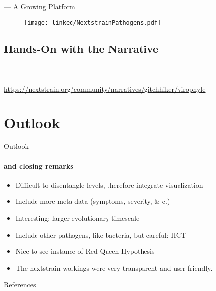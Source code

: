 \documentclass{beamer}
\begin{document}
\begin{darkframes}
    \begin{frame}{\secname --- A Growing Platform}
      \begin{figure}
        \texttt{[image: linked/NextstrainPathogens.pdf]}
        \vspace*{-.2cm}
        \caption{\footnotesize }
      \end{figure}
    \end{frame}

    \subsection{Hands-On with the Narrative}

    \begin{frame}{\secname --- \subsecname}
      \framesubtitle{}
      \href{URL}{https://nextstrain.org/community/narratives/gitchhiker/virophyle}
    \end{frame}

    \section{Outlook}

    \begin{frame}{Outlook}
      \framesubtitle{and closing remarks}
      \begin{itemize}
        \item Difficult to disentangle levels, therefore integrate visualization
        \item Include more meta data (symptoms, severity, \& c.)
        \item Interesting: larger evolutionary timescale
        \item Include other pathogens, like bacteria, but careful: HGT
        \item Nice to see instance of Red Queen Hypothesis
        \item The nextstrain workings were very transparent and user friendly.
      \end{itemize}
    \end{frame}

    \begin{frame}[allowframebreaks]{References}
    \tiny


    \end{frame}




  \end{darkframes}
\end{document}
